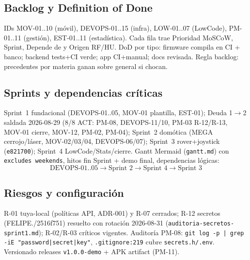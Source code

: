 \documentclass[conference]{IEEEtran}
\begin{document}
\subsection{Backlog y Definition of Done}
IDs MOV-01..10 (móvil), DEVOPS-01..15 (infra), LOW-01..07 (LowCode), PM-01..11 (gestión), EST-01..11 (estadística). Cada fila trae Prioridad MoSCoW, Sprint, Depende de y Origen RF/HU. DoD por tipo: firmware compila en CI + banco; backend tests+CI verde; app CI+manual; docs revisada. Regla backlog: precedentes por materia ganan sobre general si chocan.

\subsection{Sprints y dependencias críticas}
Sprint~1 fundacional (DEVOPS-01..05, MOV-01 plantilla, EST-01); Deuda 1$\rightarrow$2 saldada 2026-08-29 (8/8 ACT: PM-08, DEVOPS-11/10, PM-03 R-12/R-13, MOV-01 cierre, MOV-12, PM-02, PM-04); Sprint~2 domótica (MEGA cerrojo/láser, MOV-02/03/04, DEVOPS-06/07); Sprint~3 rover+joystick (\texttt{e821700}); Sprint~4 LowCode/Stats/cierre. Gantt Mermaid (\texttt{gantt.md}) con \texttt{excludes weekends}, hitos fin Sprint + demo final, dependencias lógicas:
\begin{equation}
\text{DEVOPS-01..05}\rightarrow\text{Sprint~2}\rightarrow\text{Sprint~4}\rightarrow\text{Sprint~3}
\end{equation}

\subsection{Riesgos y configuración}
R-01 tuya-local (políticas API, ADR-001) y R-07 cerrados; R-12 secretos (FELIPE./2516f751) resuelto con rotación 2026-08-31 (\texttt{auditoria-secretos-sprint1.md}); R-02/R-03 críticos vigentes. Auditoría PM-08: \texttt{git log -p | grep -iE "password|secret|key"}, \texttt{.gitignore:219} cubre \texttt{secrets.h/.env}. Versionado releases \texttt{v1.0.0-demo} + APK artifact (PM-11).
\end{document}
